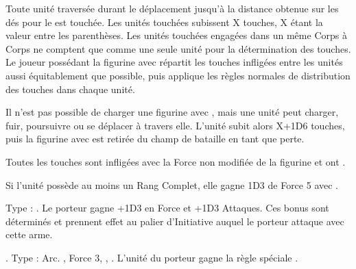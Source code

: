 Toute unité traversée durant le déplacement jusqu'à la distance obtenue sur les dés pour le \randommovement{} est touchée. Les unités touchées subissent X touches, X étant la valeur entre les parenthèses. Les unités touchées engagées dans un même Corps à Corps ne comptent que comme une seule unité pour la détermination des touches. Le joueur possédant la figurine avec \ricochet{} répartit les touches infligées entre les unités aussi équitablement que possible, puis applique les règles normales de distribution des touches dans chaque unité.

Il n'est pas possible de charger une figurine avec \ricochet{}, mais une unité peut charger, fuir, poursuivre ou se déplacer à travers elle. L'unité subit alors X+1D6 touches, puis la figurine avec \ricochet{} est retirée du champ de bataille en tant que perte.

Toutes les touches sont infligées avec la Force non modifiée de la figurine et ont .


\closearmyspecialrules


\vspace{1.5cm}
\startarmyarmoury

\startitemlistonecol

\listitemonecol{\powershroom} 

\listitemonecol{\mammothstabber} Si l'unité possède au moins un Rang Complet, elle gagne 1D3 \impacthits{} de Force 5 avec \multiplewounds{\ordnance}{\largetarget}.

\enditemlistonecol

\closearmyarmoury




\startarmymagicalitems

\armymagicalweapons

\startpricelist

Type : \hw{}. Le porteur gagne +1D3 en Force et +1D3 Attaques. Ces bonus sont déterminés et prennent effet au palier d'Initiative auquel le porteur attaque avec cette arme.

 .
\newline Type : Arc. , Force 3, \lightningattacks{}, . L'unité du porteur gagne la règle spéciale \quicktofire{}.

